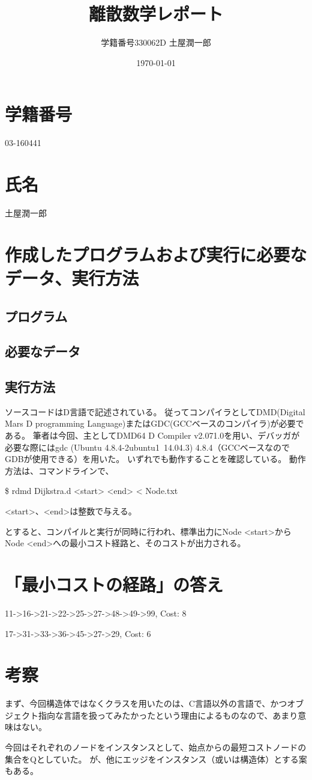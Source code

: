 \documentclass[10pt,a4j,dvipdfmx]{jsarticle}
\title{離散数学レポート}
\author{学籍番号330062D 土屋潤一郎}
\date{\today}
\begin{document}
\maketitle
\section{学籍番号}
03-160441
\section{氏名}
土屋潤一郎
\section{作成したプログラムおよび実行に必要なデータ、実行方法}
\subsection{プログラム}
\subsection{必要なデータ}
\subsection{実行方法}
ソースコードはD言語で記述されている。
従ってコンパイラとしてDMD(Digital Mars D programming Language)またはGDC(GCCベースのコンパイラ)が必要である。
筆者は今回、主としてDMD64 D Compiler v2.071.0を用い、デバッガが必要な際にはgdc (Ubuntu 4.8.4-2ubuntu1~14.04.3) 4.8.4（GCCベースなのでGDBが使用できる）を用いた。
いずれでも動作することを確認している。
動作方法は、コマンドラインで、
\begin{description}
\item \$ rdmd Dijkstra.d <start> <end> < Node.txt
\item *<start>、<end>は整数で与える。
\end{description}

とすると、コンパイルと実行が同時に行われ、標準出力にNode <start>からNode <end>への最小コスト経路と、そのコストが出力される。

\section{「最小コストの経路」の答え}
\begin{description}
\item 11->16->21->22->25->27->48->49->99, Cost: 8
\item 17->31->33->36->45->27->29, Cost: 6
\end{description}
\section{考察}
まず、今回構造体ではなくクラスを用いたのは、C言語以外の言語で、かつオブジェクト指向な言語を扱ってみたかったという理由によるものなので、あまり意味はない。

今回はそれぞれのノードをインスタンスとして、始点からの最短コストノードの集合をQとしていた。
が、他にエッジをインスタンス（或いは構造体）とする案もある。
\end{document}
